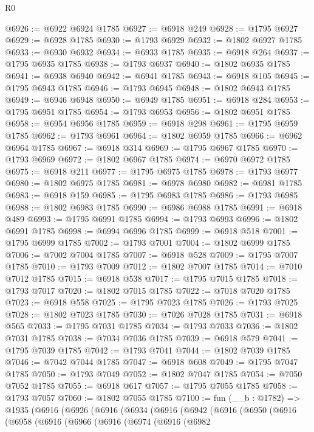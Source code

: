 \begin{lexlean}{R0}
\begin{coremodule}
@6926 := @6922 @6924 @1785
@6927 := @6918 @249
@6928 := @1795 @6927
@6929 := @6928 @1785
@6930 := @1793 @6929
@6932 := @1802 @6927 @1785
@6933 := @6930 @6932
@6934 := @6933 @1785
@6935 := @6918 @264
@6937 := @1795 @6935 @1785
@6938 := @1793 @6937
@6940 := @1802 @6935 @1785
@6941 := @6938 @6940
@6942 := @6941 @1785
@6943 := @6918 @105
@6945 := @1795 @6943 @1785
@6946 := @1793 @6945
@6948 := @1802 @6943 @1785
@6949 := @6946 @6948
@6950 := @6949 @1785
@6951 := @6918 @284
@6953 := @1795 @6951 @1785
@6954 := @1793 @6953
@6956 := @1802 @6951 @1785
@6958 := @6954 @6956 @1785
@6959 := @6918 @298
@6961 := @1795 @6959 @1785
@6962 := @1793 @6961
@6964 := @1802 @6959 @1785
@6966 := @6962 @6964 @1785
@6967 := @6918 @314
@6969 := @1795 @6967 @1785
@6970 := @1793 @6969
@6972 := @1802 @6967 @1785
@6974 := @6970 @6972 @1785
@6975 := @6918 @211
@6977 := @1795 @6975 @1785
@6978 := @1793 @6977
@6980 := @1802 @6975 @1785
@6981 := @6978 @6980
@6982 := @6981 @1785
@6983 := @6918 @159
@6985 := @1795 @6983 @1785
@6986 := @1793 @6985
@6988 := @1802 @6983 @1785
@6990 := @6986 @6988 @1785
@6991 := @6918 @489
@6993 := @1795 @6991 @1785
@6994 := @1793 @6993
@6996 := @1802 @6991 @1785
@6998 := @6994 @6996 @1785
@6999 := @6918 @518
@7001 := @1795 @6999 @1785
@7002 := @1793 @7001
@7004 := @1802 @6999 @1785
@7006 := @7002 @7004 @1785
@7007 := @6918 @528
@7009 := @1795 @7007 @1785
@7010 := @1793 @7009
@7012 := @1802 @7007 @1785
@7014 := @7010 @7012 @1785
@7015 := @6918 @538
@7017 := @1795 @7015 @1785
@7018 := @1793 @7017
@7020 := @1802 @7015 @1785
@7022 := @7018 @7020 @1785
@7023 := @6918 @558
@7025 := @1795 @7023 @1785
@7026 := @1793 @7025
@7028 := @1802 @7023 @1785
@7030 := @7026 @7028 @1785
@7031 := @6918 @565
@7033 := @1795 @7031 @1785
@7034 := @1793 @7033
@7036 := @1802 @7031 @1785
@7038 := @7034 @7036 @1785
@7039 := @6918 @579
@7041 := @1795 @7039 @1785
@7042 := @1793 @7041
@7044 := @1802 @7039 @1785
@7046 := @7042 @7044 @1785
@7047 := @6918 @608
@7049 := @1795 @7047 @1785
@7050 := @1793 @7049
@7052 := @1802 @7047 @1785
@7054 := @7050 @7052 @1785
@7055 := @6918 @617
@7057 := @1795 @7055 @1785
@7058 := @1793 @7057
@7060 := @1802 @7055 @1785
@7100 := fun (__b : @1782) =>
  @1935
    (@6916
      (@6926
        (@6916
          (@6934
            (@6916
              (@6942
                (@6916
                  (@6950
                    (@6916
                      (@6958
                        (@6916
                          (@6966
                            (@6916
                              (@6974
                                (@6916
                                  (@6982

\end{coremodule}
\end{lexlean}
